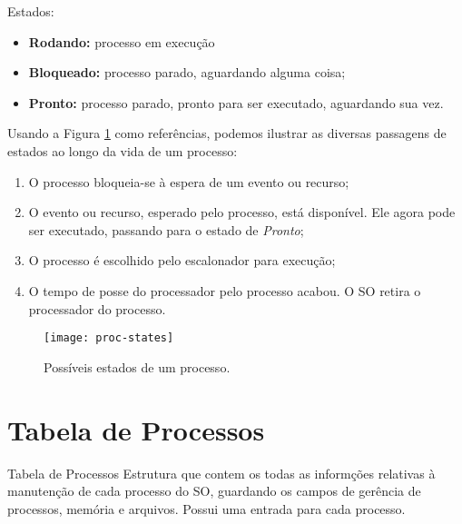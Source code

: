Estados:
\begin{itemize}
  \item \textbf{Rodando:} processo em execução
  \item \textbf{Bloqueado:} processo parado, aguardando alguma coisa;
  \item \textbf{Pronto:} processo parado, pronto para ser executado, aguardando sua vez.
\end{itemize}

Usando a Figura \ref{fig:proc-states} como referências, podemos ilustrar as diversas passagens de estados ao longo da vida de um processo:

\begin{enumerate}
  \item O processo bloqueia-se à espera de um evento ou recurso;

  \item O evento ou recurso, esperado pelo processo, está disponível. Ele agora pode ser executado, passando para o estado de \textit{Pronto};

  \item O processo é escolhido pelo escalonador para execução;

  \item O tempo de posse do processador pelo processo acabou. O SO retira o processador do processo.
\end{enumerate}

\begin{figure}[ht]
  \centering
  \texttt{[image: proc-states]}
  \caption{Possíveis estados de um processo.}
  \label{fig:proc-states}
\end{figure}

















\section{Tabela de Processos}
\begin{definicao}{Tabela de Processos}
  Estrutura que contem os todas as informções relativas à manutenção de cada processo do SO, guardando os campos de gerência de processos, memória e arquivos. Possui uma entrada para cada processo.
\end{definicao}

